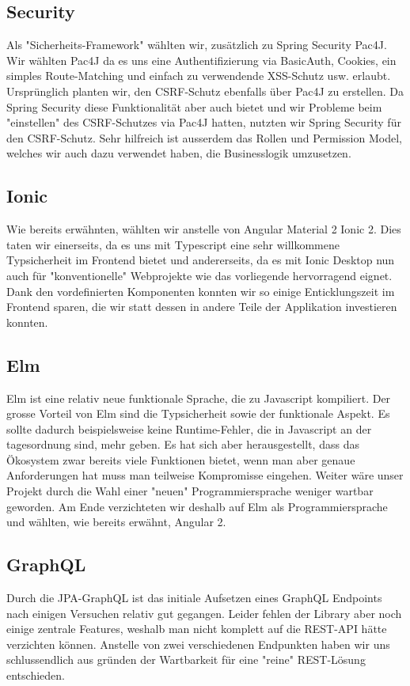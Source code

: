 \documentclass[11pt]{article} %
\begin{document}
\subsection{Security}
Als "Sicherheits-Framework" wählten wir, zusätzlich zu Spring Security Pac4J. Wir wählten Pac4J da es uns eine Authentifizierung via BasicAuth, Cookies, ein simples Route-Matching und einfach zu verwendende XSS-Schutz usw. erlaubt. Ursprünglich planten wir, den CSRF-Schutz ebenfalls über Pac4J zu erstellen. Da Spring Security diese Funktionalität aber auch bietet und wir Probleme beim "einstellen" des CSRF-Schutzes via Pac4J hatten, nutzten wir Spring Security für den CSRF-Schutz. Sehr hilfreich ist ausserdem das Rollen und Permission Model, welches wir auch dazu verwendet haben, die Businesslogik umzusetzen.

\subsection{Ionic}
Wie bereits erwähnten, wählten wir anstelle von Angular Material 2 Ionic 2. Dies taten wir einerseits, da es uns mit Typescript eine sehr willkommene Typsicherheit im Frontend bietet und andererseits, da es mit Ionic Desktop nun auch für "konventionelle" Webprojekte wie das vorliegende hervorragend eignet. Dank den vordefinierten Komponenten konnten wir so einige Enticklungszeit im Frontend sparen, die wir statt dessen in andere Teile der Applikation investieren konnten.

\subsection{Elm}
Elm ist eine relativ neue funktionale Sprache, die zu Javascript kompiliert. Der grosse Vorteil von Elm sind die Typsicherheit sowie der funktionale Aspekt. Es sollte dadurch beispielsweise keine Runtime-Fehler, die in Javascript an der tagesordnung sind, mehr geben.
Es hat sich aber herausgestellt, dass das Ökosystem zwar bereits viele Funktionen bietet, wenn man aber genaue Anforderungen hat muss man teilweise Kompromisse eingehen.
Weiter wäre unser Projekt durch die Wahl einer "neuen" Programmiersprache weniger wartbar geworden. Am Ende verzichteten wir deshalb auf Elm als Programmiersprache und wählten, wie bereits erwähnt, Angular 2.

\subsection{GraphQL}
Durch die JPA-GraphQL ist das initiale Aufsetzen eines GraphQL Endpoints nach einigen Versuchen relativ gut gegangen. Leider fehlen der Library aber noch einige zentrale Features, weshalb man nicht komplett auf die REST-API hätte verzichten können. Anstelle von zwei verschiedenen Endpunkten haben wir uns schlussendlich aus gründen der Wartbarkeit für eine "reine" REST-Lösung entschieden.
\end{document}
